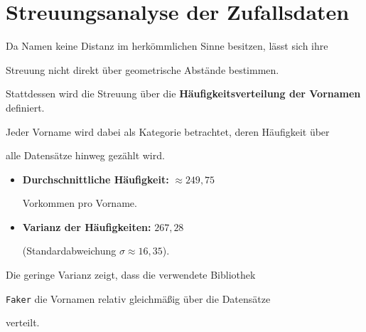 \documentclass{article}
\begin{document}
\section{Streuungsanalyse der Zufallsdaten}

Da Namen keine Distanz im herkömmlichen Sinne besitzen, lässt sich ihre

Streuung nicht direkt über geometrische Abstände bestimmen.

Stattdessen wird die Streuung über die
\textbf{Häufigkeitsverteilung der Vornamen} definiert.

Jeder Vorname wird dabei als Kategorie betrachtet, deren Häufigkeit über

alle Datensätze hinweg gezählt wird.



\begin{itemize}


    \item \textbf{Durchschnittliche Häufigkeit:}
    $\approx 249{,}75$

    Vorkommen pro Vorname.


    \item \textbf{Varianz der Häufigkeiten:}
    $267{,}28$

    (Standardabweichung $\sigma \approx 16{,}35$).


\end{itemize}

Die geringe Varianz zeigt, dass die verwendete Bibliothek

\texttt{Faker} die Vornamen relativ gleichmäßig über die Datensätze

verteilt.


\end{document}
